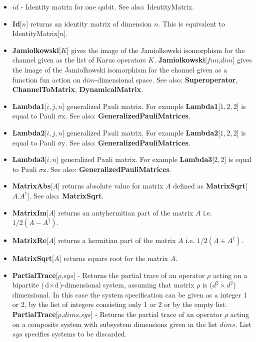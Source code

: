 \documentclass[a4paper,10pt]{scrartcl}
\begin{document}
\begin{itemize}
\item  $id$ - Identity matrix for one qubit. See also: IdentityMatrix.
\item  \textbf{Id}[$n$] returns an identity matrix of dimension $n$. This is equivalent to IdentityMatrix[$n$].
\item  \textbf{Jamiolkowski}[$K$] gives the image of the Jamiolkowski isomorphism for the channel given as the list of Karus operators $K$. \newline{}
\textbf{Jamiolkowski}[$fun$,$dim$] gives the image of the Jamiolkowski isomorphism for the channel given as a function fun action on $dim$-dimensional space. See also: \textbf{Superoperator}, \textbf{ChannelToMatrix}, \textbf{DynamicalMatrix}.
\item  \textbf{Lambda1}[$i,j,n$] generalized Pauli matrix. For example \textbf{Lambda1}[$1,2,2$] is equal to Pauli $\text{$\sigma $x}$. See also: \textbf{GeneralizedPauliMatrices}.
\item  \textbf{Lambda2}[$i,j,n$] generalized Pauli matrix. For example \textbf{Lambda2}[$1,2,2$] is equal to Pauli $\text{$\sigma $y}$. See also: \textbf{GeneralizedPauliMatrices}.
\item  \textbf{Lambda3}[$i,n$] generalized Pauli matrix. For example \textbf{Lambda3}[$2,2$] is equal to Pauli $\text{$\sigma $z}$. See also: \textbf{GeneralizedPauliMatrices}.
\item  \textbf{MatrixAbs}[$A$] returns absolute value for matrix $A$ defined as \textbf{MatrixSqrt}[$A.A^{\dagger }$]. See also: \textbf{MatrixSqrt}.
\item  \textbf{MatrixIm}[$A$] returns an antyhermitian part of the matrix $A$ i.e. $1/2(A-A^{\dagger })$.
\item  \textbf{MatrixRe}[$A$] returns a hermitian part of the matrix $A$ i.e. $1/2(A+A^{\dagger })$.
\item  \textbf{MatrixSqrt}[$A$] returns square root for the matrix $A$.
\item  \textbf{PartialTrace}[$\rho$,$sys$] - Returns the partial trace of an operator $\rho$ acting on a bipartite ($\text{d$\times $d}$)-dimensional system, assuming that matrix $\rho$ is ($d^2\times d^2$) dimensional. In this case the system specification can be given as a integer 1 or 2, by the list of integers consisting only 1 or 2 or by the empty list. \newline{}
\textbf{PartialTrace}[$\rho$,$dims$,$sys$] - Returns the partial trace of an operator $\rho$ acting on a composite system with subsystem dimensions given in the list $dims$. List $sys$ specifies systems to be discarded.

\end{itemize}
\end{document}
